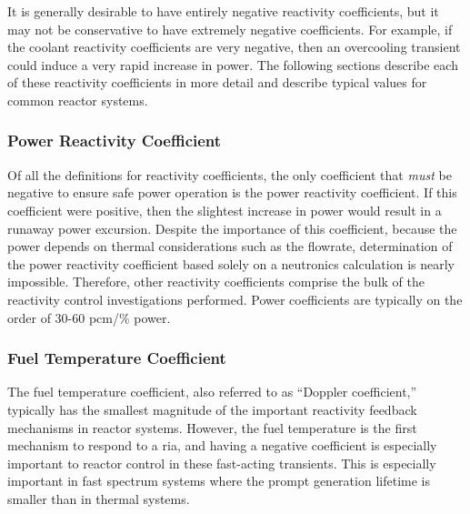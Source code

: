 It is generally desirable to have entirely negative reactivity coefficients, but it may not be conservative to have extremely negative coefficients. For example, if the coolant reactivity coefficients are very negative, then an overcooling transient could induce a very rapid increase in power. The following sections describe each of these reactivity coefficients in more detail and describe typical values for common reactor systems.

\subsubsection{Power Reactivity Coefficient}
Of all the definitions for reactivity coefficients, the only coefficient that {\it must} be negative to ensure safe power operation is the power reactivity coefficient. If this coefficient were positive, then the slightest increase in power would result in a runaway power excursion. Despite the importance of this coefficient, because the power depends on thermal considerations such as the flowrate, determination of the power reactivity coefficient based solely on a neutronics calculation is nearly impossible. Therefore, other reactivity coefficients comprise the bulk of the reactivity control investigations performed. Power coefficients are typically on the order of 30-60 pcm/\% power.

\subsubsection{Fuel Temperature Coefficient}
The fuel temperature coefficient, also referred to as ``Doppler coefficient,'' typically has the smallest magnitude of the important reactivity feedback mechanisms in reactor systems. However, the fuel temperature is the first mechanism to respond to a \gls{ria}, and having a negative coefficient is especially important to reactor control in these fast-acting transients. This is especially important in fast spectrum systems where the prompt generation lifetime is smaller than in thermal systems. 

